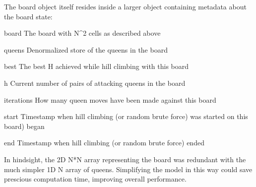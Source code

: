 The board object itself resides inside a larger object containing metadata about the board state:

\begin{description}
\item{board} The board with N^2 cells as described above
\item{queens} Denormalized store of the queens in the board
\item{best} The best H achieved while hill climbing with this board
\item{h} Current number of pairs of attacking queens in the board
\item{iterations} How many queen moves have been made against this board
\item{start} Timestamp when hill climbing (or random brute force) was started on this board) began
\item{end} Timestamp when hill climbing (or random brute force) ended
\end{description}

In hindsight, the 2D N*N array representing the board was redundant with the much simpler 1D N array of queens.
Simplifying the model in this way could save prescious computation time, improving overall performance.